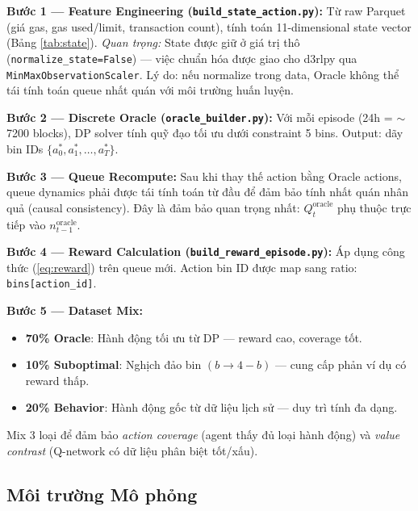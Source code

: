 \vspace{0.5em}\noindent\textbf{Bước 1 — Feature Engineering (\texttt{build\_state\_action.py}):}
Từ raw Parquet (giá gas, gas used/limit, transaction count), tính toán 11-dimensional state vector (Bảng \ref{tab:state}). \textit{Quan trọng:} State được giữ ở giá trị thô (\texttt{normalize\_state=False}) — việc chuẩn hóa được giao cho d3rlpy qua \texttt{MinMaxObservationScaler}. Lý do: nếu normalize trong data, Oracle không thể tái tính toán queue nhất quán với môi trường huấn luyện.

\vspace{0.5em}\noindent\textbf{Bước 2 — Discrete Oracle (\texttt{oracle\_builder.py}):}
Với mỗi episode (24h = $\sim$7200 blocks), DP solver tính quỹ đạo tối ưu dưới constraint 5 bins. Output: dãy bin IDs $\{a^*_0, a^*_1, \ldots, a^*_T\}$.

\vspace{0.5em}\noindent\textbf{Bước 3 — Queue Recompute:}
Sau khi thay thế action bằng Oracle actions, queue dynamics phải được tái tính toán từ đầu để đảm bảo tính nhất quán nhân quả (causal consistency). Đây là đảm bảo quan trọng nhất: $Q_t^{\text{oracle}}$ phụ thuộc trực tiếp vào $n_{t-1}^{\text{oracle}}$.

\vspace{0.5em}\noindent\textbf{Bước 4 — Reward Calculation (\texttt{build\_reward\_episode.py}):}
Áp dụng công thức (\ref{eq:reward}) trên queue mới. Action bin ID được map sang ratio: \texttt{bins[action\_id]}.

\vspace{0.5em}\noindent\textbf{Bước 5 — Dataset Mix:}
\begin{itemize}
    \item \textbf{70\% Oracle}: Hành động tối ưu từ DP — reward cao, coverage tốt.
    \item \textbf{10\% Suboptimal}: Nghịch đảo bin $(b \to 4-b)$ — cung cấp phản ví dụ có reward thấp.
    \item \textbf{20\% Behavior}: Hành động gốc từ dữ liệu lịch sử — duy trì tính đa dạng.
\end{itemize}

Mix 3 loại để đảm bảo \textit{action coverage} (agent thấy đủ loại hành động) và \textit{value contrast} (Q-network có dữ liệu phân biệt tốt/xấu).

\subsection{Môi trường Mô phỏng}

